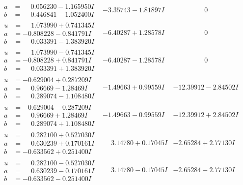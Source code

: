 \documentclass[1p]{elsarticle_modified}
\theoremstyle{definition}
\begin{document}
$$\begin{array}{c|c|c}
\begin{aligned}
a &= \phantom{-}0.056230 - 1.165950 I \\
b &= \phantom{-}0.446841 - 1.052400 I\end{aligned}
 & -3.35743 - 1.81897 I & \phantom{-0.000000 } 0 \\ \hline\begin{aligned}
u &= \phantom{-}1.073990 + 0.741345 I \\
a &= -0.808228 - 0.841791 I \\
b &= \phantom{-}0.033391 - 1.383920 I\end{aligned}
 & -6.40287 + 1.28578 I & \phantom{-0.000000 } 0 \\ \hline\begin{aligned}
u &= \phantom{-}1.073990 - 0.741345 I \\
a &= -0.808228 + 0.841791 I \\
b &= \phantom{-}0.033391 + 1.383920 I\end{aligned}
 & -6.40287 - 1.28578 I & \phantom{-0.000000 } 0 \\ \hline\begin{aligned}
u &= -0.629004 + 0.287209 I \\
a &= \phantom{-}0.96669 - 1.28469 I \\
b &= \phantom{-}0.289074 - 1.108480 I\end{aligned}
 & -1.49663 + 0.99559 I & -12.39912 - 2.84502 I \\ \hline\begin{aligned}
u &= -0.629004 - 0.287209 I \\
a &= \phantom{-}0.96669 + 1.28469 I \\
b &= \phantom{-}0.289074 + 1.108480 I\end{aligned}
 & -1.49663 - 0.99559 I & -12.39912 + 2.84502 I \\ \hline\begin{aligned}
u &= \phantom{-}0.282100 + 0.527030 I \\
a &= \phantom{-}0.630239 + 0.170161 I \\
b &= -0.633562 + 0.251400 I\end{aligned}
 & \phantom{-}3.14780 + 0.17045 I & -2.65284 + 2.77130 I \\ \hline\begin{aligned}
u &= \phantom{-}0.282100 - 0.527030 I \\
a &= \phantom{-}0.630239 - 0.170161 I \\
b &= -0.633562 - 0.251400 I\end{aligned}
 & \phantom{-}3.14780 - 0.17045 I & -2.65284 - 2.77130 I \\ \hline\begin{aligned}

\end{aligned}
\end{array}$$
\end{document}
